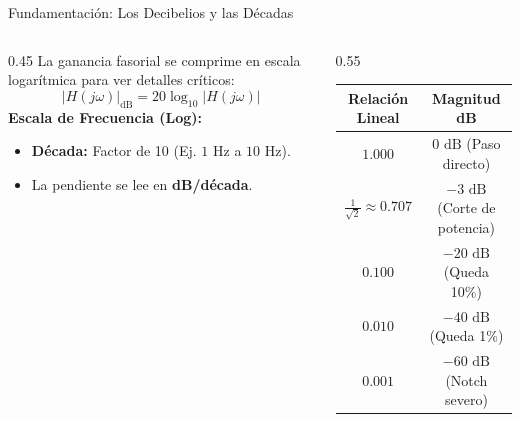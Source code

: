 \documentclass[aspectratio=169, 10pt]{beamer}
\begin{document}
\begin{frame}{Fundamentación: Los Decibelios y las Décadas}
    \begin{columns}
        \begin{column}{0.45\textwidth}
            La ganancia fasorial se comprime en escala logarítmica para ver detalles críticos:
            $$|H(j\omega)|_{\text{dB}} = 20 \log_{10} |H(j\omega)|$$
            \vspace{0.2cm}
            \textbf{Escala de Frecuencia (Log):}
            \begin{itemize}
                \item \textbf{Década:} Factor de 10 (Ej. $1\text{ Hz}$ a $10\text{ Hz}$).
                \item La pendiente se lee en \textbf{dB/década}.
            \end{itemize}
        \end{column}
        \begin{column}{0.55\textwidth}
            \small
            \begin{table}[]
                \begin{tabular}{cc}
                    \toprule
                    \textbf{Relación Lineal} & \textbf{Magnitud dB} \\
                    \midrule
                    $1.000$ & \textbf{$0\text{ dB}$} (Paso directo) \\
                    $\frac{1}{\sqrt{2}} \approx 0.707$ & \textbf{$-3\text{ dB}$} (Corte de potencia) \\
                    $0.100$ & \textbf{$-20\text{ dB}$} (Queda 10\%) \\
                    $0.010$ & \textbf{$-40\text{ dB}$} (Queda 1\%) \\
                    $0.001$ & \textbf{$-60\text{ dB}$} (Notch severo) \\
                    \bottomrule
                \end{tabular}
            \end{table}
        \end{column}
    \end{columns}
\end{frame}
\end{document}

